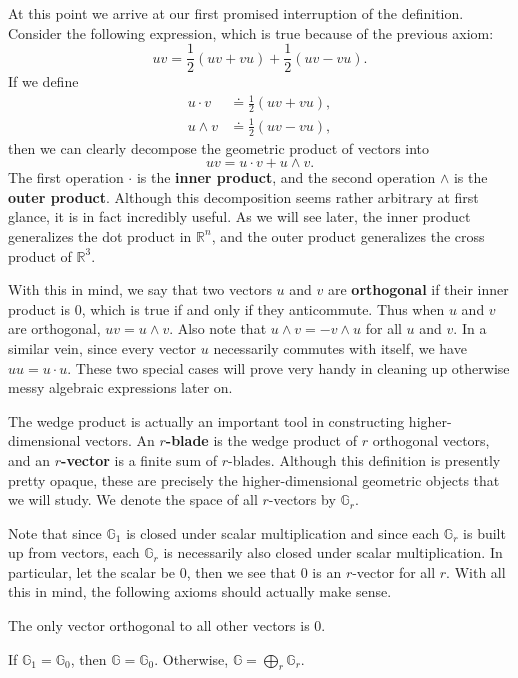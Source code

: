 \documentclass[twoside,10pt]{article}
\begin{document}
At this point we arrive at our first promised interruption of the definition. Consider the following expression, which is true because of the previous axiom:
\[
	uv = \frac{1}{2} (uv+vu) + \frac{1}{2} (uv-vu).
\] 
If we define
\begin{align*}
	u \cdot v &\doteq \frac{1}{2} (uv+vu), \\
	u \wedge v &\doteq \frac{1}{2} (uv-vu),
\end{align*}
then we can clearly decompose the geometric product of vectors into
\[
uv = u \cdot v + u \wedge v.
\] 
The first operation $\cdot$ is the \textbf{inner product}, and the second operation $\wedge$ is the \textbf{outer product}. Although this decomposition seems rather arbitrary at first glance, it is in fact incredibly useful. As we will see later, the inner product generalizes the dot product in $\mathbb{R}^{n}$, and the outer product generalizes the cross product of $\mathbb{R}^{3}$.

With this in mind, we say that two vectors $u$ and $v$ are \textbf{orthogonal} if their inner product is 0, which is true if and only if they anticommute. Thus when $u$ and $v$ are orthogonal, $uv = u \wedge v$. Also note that $u \wedge v = -v \wedge u$ for all $u$ and $v$. In a similar vein, since every vector $u$ necessarily commutes with itself, we have $uu = u \cdot u$. These two special cases will prove very handy in cleaning up otherwise messy algebraic expressions later on.

The wedge product is actually an important tool in constructing higher-dimensional vectors. An \textbf{$r$-blade} is the wedge product of $r$ orthogonal vectors, and an \textbf{$r$-vector} is a finite sum of $r$-blades. Although this definition is presently pretty opaque, these are precisely the higher-dimensional geometric objects that we will study. We denote the space of all $r$-vectors by $\mathbb{G}_{r}$.

Note that since $\mathbb{G}_{1}$ is closed under scalar multiplication and since each $\mathbb{G}_{r}$ is built up from vectors, each $\mathbb{G}_{r}$ is necessarily also closed under scalar multiplication. In particular, let the scalar be 0, then we see that $0$ is an $r$-vector for all $r$. With all this in mind, the following axioms should actually make sense.

\begin{axiom}
	The only vector orthogonal to all other vectors is 0.
\end{axiom}

\begin{axiom}
	If $\mathbb{G}_1 = \mathbb{G}_0$, then $\mathbb{G} = \mathbb{G}_{0}$. Otherwise, $\mathbb{G} = \bigoplus_{r}\mathbb{G}_{r}$.
\end{axiom}
\end{document}
